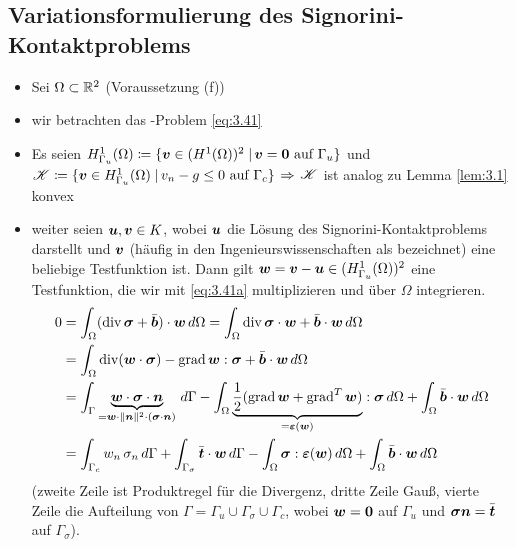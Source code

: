 \subsection{Variationsformulierung des Signorini-Kontaktproblems}
\label{kap:3.2.2}

\begin{itemize}
\item Sei $\Omega \subset \mathbb{R}^2$ (Voraussetzung (f))

\item wir betrachten das -Problem \eqref{eq:3.41}

\item Es seien
$H^1_{\Gamma_u}(\Omega) \coloneqq \{\boldsymbol v \in (H^1(\Omega))^2 \;\vert\, \boldsymbol v = \boldsymbol 0 \text{ auf } \Gamma_u\}$ und
$\mathscr K \coloneqq \{\boldsymbol v \in H^1_{\Gamma_u}(\Omega) \;\vert\, v_n - g \le 0 \text{ auf } \Gamma_c\}$ $\Rightarrow$ $\mathscr K$ ist analog zu Lemma \ref{lem:3.1} konvex

\item weiter seien $\boldsymbol u, \boldsymbol v \in K$, wobei $\boldsymbol u$ die Lösung des Signorini-Kontaktproblems darstellt und $\boldsymbol v$ (häufig in den Ingenieurswissenschaften als \textit{} bezeichnet) eine beliebige Testfunktion ist. Dann gilt $\boldsymbol w = \boldsymbol v - \boldsymbol u \in (H^1_{\Gamma_u}(\Omega))^2$ eine Testfunktion, die wir mit \eqref{eq:3.41a} multiplizieren und über $\Omega$ integrieren.
\begin{align}\notag
	 0 & =  \int_\Omega (\operatorname{div} \boldsymbol\sigma + \bar{\boldsymbol b}) \cdot \boldsymbol w \, d \Omega = \int_\Omega \operatorname{div} \boldsymbol \sigma \cdot \boldsymbol w + \bar{\boldsymbol b} \cdot \boldsymbol w \, d\Omega \\
	 \notag
	& = \int_\Omega \operatorname{div}(\boldsymbol w \cdot \boldsymbol\sigma) - \operatorname{grad} \boldsymbol w : \boldsymbol \sigma + \bar{\boldsymbol b} \cdot \boldsymbol w \, d\Omega \\
	\notag
	& = \int_\Gamma \underbrace{\boldsymbol w \cdot \boldsymbol \sigma \cdot \boldsymbol n}_{=\boldsymbol w \cdot \lVert \boldsymbol n\rVert^2 \cdot (\boldsymbol \sigma \cdot \boldsymbol n)} \, d\Gamma - \int_\Omega \underbrace{\frac 1 2 (\operatorname{grad} \boldsymbol w + \operatorname{grad}^T \boldsymbol w)}_{= \boldsymbol {\varepsilon} (\boldsymbol w)} : \boldsymbol \sigma \, d\Omega + \int_\Omega \bar{\boldsymbol b} \cdot \boldsymbol w \, d \Omega \\
	\label{eq:3.43}
	& = \int_{\Gamma_c} w_n \, \sigma_n \, d \Gamma + \int_{\Gamma_\sigma} \bar{\boldsymbol t} \cdot \boldsymbol w \, d\Gamma-\int_\Omega \boldsymbol\sigma: \boldsymbol {\varepsilon}(\boldsymbol w) \, d\Omega + \int_\Omega \bar{\boldsymbol b} \cdot \boldsymbol w \, d\Omega
\end{align}
(zweite Zeile ist Produktregel für die Divergenz, dritte Zeile Gauß, vierte Zeile die Aufteilung von $\Gamma = \Gamma_u \cup \Gamma_\sigma \cup \Gamma_c$, wobei $\boldsymbol w = \boldsymbol 0$ auf $\Gamma_u$ und $\boldsymbol \sigma \boldsymbol n = \bar{\boldsymbol t}$ auf $\Gamma_\sigma$).


\end{itemize}
